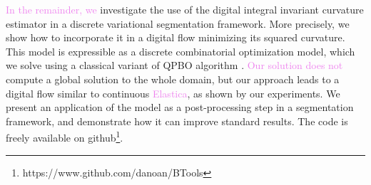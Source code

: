 \documentclass[runningheads]{llncs}
\newcommand{\HT}[1]{{\textcolor{violet}{#1}}}
\begin{document}
\HT{In the remainder, we} investigate the use of the digital integral invariant
curvature estimator \cite{coeurjolly13integral} in a discrete
variational segmentation framework. More precisely, we show how to
incorporate it in a digital flow minimizing its squared
curvature. This model is expressible as a discrete combinatorial
optimization model, which we solve using a classical variant of QPBO
algorithm \cite{rother07qpbo}. \HT{Our solution does not} compute a global
solution to the whole domain, but our approach leads to a digital flow
similar to continuous \HT{Elastica}, as shown by our experiments. We
present an application of the model as a post-processing step in a
segmentation framework, and demonstrate how it can improve standard
results. The code is freely available on
github\footnote{https://www.github.com/danoan/BTools}.


\end{document}
